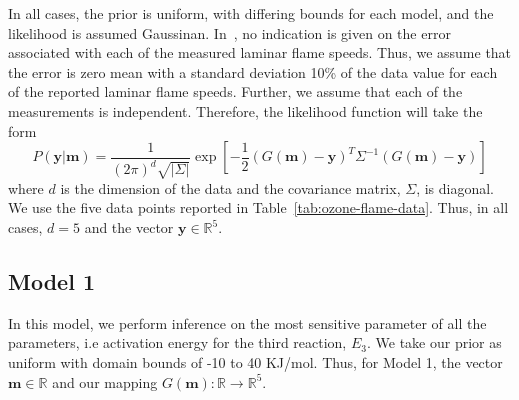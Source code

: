  In all cases,
the prior is uniform, with differing bounds for each model, and the
likelihood is assumed Gaussinan. In~\cite{Streng}, no indication is
given on the error associated with each of the measured laminar flame
speeds. Thus, we assume that the error is zero mean with a standard
deviation 10\% of the data value for each of the reported laminar
flame speeds. Further, we assume that each of the measurements is
independent. Therefore, the likelihood function will take the form
%
\begin{equation}
P(\mathbf{y}|\mathbf{m}) = \frac{1}{(2\pi)^d \sqrt{|\Sigma|}}
\exp\left[ -\frac{1}{2}\left(G(\mathbf{m}) -
  \mathbf{y}\right)^T\Sigma^{-1} \left(G(\mathbf{m}) -
  \mathbf{y}\right) \right]
\end{equation}
%
where $d$ is the dimension of the data and the covariance matrix, $\Sigma$, is diagonal.
We use the five data points reported in Table~\ref{tab:ozone-flame-data}.
Thus, in all cases, $d = 5$ and the vector $\mathbf{y} \in \mathbb{R}^5$.

 




\subsection{Model 1}
 In this model, we perform inference on the most
 sensitive parameter of all the parameters, i.e activation energy for
 the third reaction, $E_3$. We take our prior as uniform with domain
 bounds of -10 to 40 KJ/mol. Thus, for Model 1, the vector
 $\mathbf{m} \in \mathbb{R}$ and our mapping $G(\mathbf{m}):
 \mathbb{R} \rightarrow \mathbb{R}^5$.


